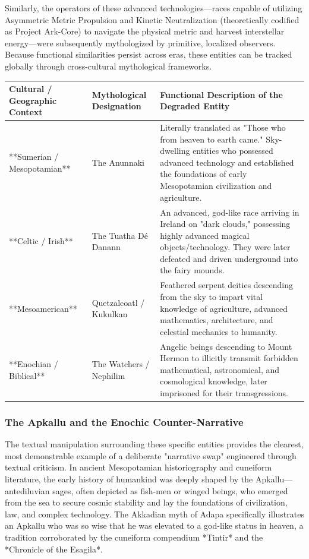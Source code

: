 \documentclass[aps,prd,11pt,onecolumn,superscriptaddress,nofootinbib,floatfix]{revtex4-2}
\begin{document}
Similarly, the operators of these advanced technologies---races capable of utilizing Asymmetric Metric Propulsion and Kinetic Neutralization (theoretically codified as Project Ark-Core) to navigate the physical metric and harvest interstellar energy---were subsequently mythologized by primitive, localized observers. Because functional similarities persist across eras, these entities can be tracked globally through cross-cultural mythological frameworks.


\begin{table}[h!]
\centering
\begin{tabular}{p{3cm}p{3cm}p{3cm}}
\hline
Cultural / Geographic Context & Mythological Designation & Functional Description of the Degraded Entity \\
\hline
**Sumerian / Mesopotamian** & The Anunnaki & Literally translated as "Those who from heaven to earth came." Sky-dwelling entities who possessed advanced technology and established the foundations of early Mesopotamian civilization and agriculture. \\
**Celtic / Irish** & The Tuatha Dé Danann & An advanced, god-like race arriving in Ireland on "dark clouds," possessing highly advanced magical objects/technology. They were later defeated and driven underground into the fairy mounds. \\
**Mesoamerican** & Quetzalcoatl / Kukulkan & Feathered serpent deities descending from the sky to impart vital knowledge of agriculture, advanced mathematics, architecture, and celestial mechanics to humanity. \\
**Enochian / Biblical** & The Watchers / Nephilim & Angelic beings descending to Mount Hermon to illicitly transmit forbidden mathematical, astronomical, and cosmological knowledge, later imprisoned for their transgressions. \\
\hline
\end{tabular}
\end{table}



\subsubsection{The Apkallu and the Enochic Counter-Narrative}
The textual manipulation surrounding these specific entities provides the clearest, most demonstrable example of a deliberate "narrative swap" engineered through textual criticism. In ancient Mesopotamian historiography and cuneiform literature, the early history of humankind was deeply shaped by the Apkallu---antediluvian sages, often depicted as fish-men or winged beings, who emerged from the sea to secure cosmic stability and lay the foundations of civilization, law, and complex technology. The Akkadian myth of Adapa specifically illustrates an Apkallu who was so wise that he was elevated to a god-like status in heaven, a tradition corroborated by the cuneiform compendium *Tintir* and the *Chronicle of the Esagila*.
\end{document}
